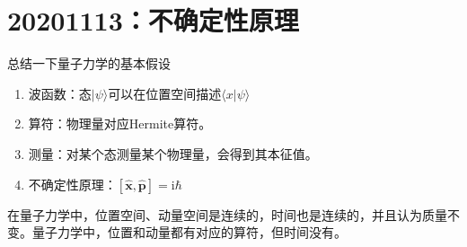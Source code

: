     \section{20201113：不确定性原理}
        总结一下量子力学的基本假设
        \begin{enumerate}
            \item 波函数：态$|\psi \rangle$可以在位置空间描述$\langle x|\psi\rangle$
            \item 算符：物理量对应Hermite算符。
            \item 测量：对某个态测量某个物理量，会得到其本征值。
            \item 不确定性原理：$[\hat{\bm{x}},\hat{\bm{p}}] = \mathrm{i}\hbar$
        \end{enumerate}
        在量子力学中，位置空间、动量空间是连续的，时间也是连续的，并且认为质量不变。量子力学中，位置和动量都有对应的算符，但时间没有。

